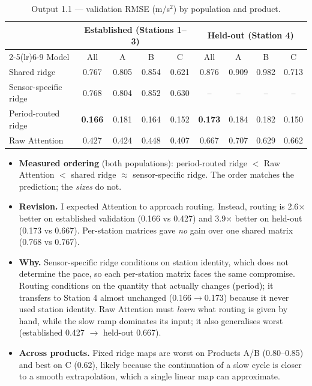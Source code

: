 \documentclass[10.5pt,a4paper]{article}
\begin{document}
\begin{table}[H]\centering\small
\caption{Output 1.1 --- validation RMSE (m/s$^2$) by population and product.}
\begin{tabular}{lcccccccc}\toprule
& \multicolumn{4}{c}{Established (Stations 1--3)} & \multicolumn{4}{c}{Held-out (Station 4)}\\
\cmidrule(lr){2-5}\cmidrule(lr){6-9}
Model & All & A & B & C & All & A & B & C\\\midrule
Shared ridge & 0.767 & 0.805 & 0.854 & 0.621 & 0.876 & 0.909 & 0.982 & 0.713\\
Sensor-specific ridge & 0.768 & 0.804 & 0.852 & 0.630 & -- & -- & -- & --\\
Period-routed ridge & \textbf{0.166} & 0.181 & 0.164 & 0.152 & \textbf{0.173} & 0.184 & 0.182 & 0.150\\
Raw Attention & 0.427 & 0.424 & 0.448 & 0.407 & 0.667 & 0.707 & 0.629 & 0.662\\\bottomrule
\end{tabular}\end{table}

\begin{itemize}
\item \textbf{Measured ordering} (both populations): period-routed ridge $<$ Raw Attention $<$ shared ridge $\approx$ sensor-specific ridge. The order matches the prediction; the \emph{sizes} do not.
\item \textbf{Revision.} I expected Attention to approach routing. Instead, routing is 2.6$\times$ better on established validation (0.166 vs 0.427) and 3.9$\times$ better on held-out (0.173 vs 0.667). Per-station matrices gave \emph{no} gain over one shared matrix (0.768 vs 0.767).
\item \textbf{Why.} Sensor-specific ridge conditions on station identity, which does not determine the pace, so each per-station matrix faces the same compromise. Routing conditions on the quantity that actually changes (period); it transfers to Station 4 almost unchanged (0.166$\to$0.173) because it never used station identity. Raw Attention must \emph{learn} what routing is given by hand, while the slow ramp dominates its input; it also generalises worst (established 0.427 $\to$ held-out 0.667).
\item \textbf{Across products.} Fixed ridge maps are worst on Products A/B (0.80--0.85) and best on C (0.62), likely because the continuation of a slow cycle is closer to a smooth extrapolation, which a single linear map can approximate.
\end{itemize}
\end{document}
